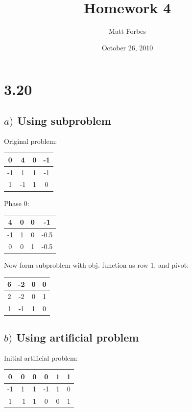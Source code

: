 \documentclass[a4paper,12pt]{article}
\begin{document}
\title{Homework 4}
\author{Matt Forbes}
\date{October 26, 2010}
\maketitle
\section*{3.20}
\subsection*{\(a)\) Using subproblem}
Original problem:
\begin{center}
\begin{tabular}{| c | c  c  c |}
\hline
0 & 4 & 0 & -1\\
\hline
-1 & 1 & 1 & -1\\
1 & -1 & 1 & 0\\
\hline
\end{tabular}
\end{center}

Phase 0:
\begin{center}
\begin{tabular}{| c | c  c  c |}
\hline
4 & 0 & 0 & -1\\
\hline
-1 & 1 & 0 & -0.5\\
0 & 0 & 1 & -0.5\\
\hline
\end{tabular}
\end{center}

Now form subproblem with obj. function as row 1, and pivot:
\begin{center}
\begin{tabular}{| c | c  c  c |}
\hline
6 & -2 & 0 & 0\\
\hline
2 & -2 & 0 & 1\\
1 & -1 & 1 & 0\\
\hline
\end{tabular}
\end{center}

\subsection*{\(b)\) Using artificial problem}
Initial artificial problem:
\begin{center}
\begin{tabular}{| c | c  c  c  c  c |}
\hline
0 & 0 & 0 & 0 & 1 & 1\\
\hline
-1 & 1 & 1 & -1 & 1 & 0\\
1 & -1 & 1 & 0 & 0 & 1\\
\hline
\end{tabular}
\end{center}
\end{document}
